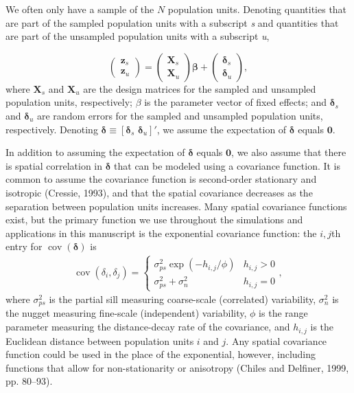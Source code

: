 \documentclass[]{elsarticle} %
\begin{document}
We often only have a sample of the \(N\) population units. Denoting
quantities that are part of the sampled population units with a
subscript \emph{s} and quantities that are part of the unsampled
population units with a subscript \emph{u},

\begin{equation}
\begin{pmatrix} \label{equation:Zmarginal}
    \mathbf{z}_s      \\
    \mathbf{z}_u
\end{pmatrix}
=
\begin{pmatrix}
  \mathbf{X}_s    \\
  \mathbf{X}_u
\end{pmatrix}
\bm{\beta} +
\begin{pmatrix}
\bm{\delta}_s    \\
\bm{\delta}_u
\end{pmatrix},
\end{equation} where \(\mathbf{X}_s\) and \(\mathbf{X}_u\) are the
design matrices for the sampled and unsampled population units,
respectively; \(\beta\) is the parameter vector of fixed effects; and
\(\bm{\delta}_s\) and \(\bm{\delta}_u\) are random errors for the
sampled and unsampled population units, respectively. Denoting
\(\bm{\delta} \equiv [\bm{\delta}_s \,\, \bm{\delta}_u]'\), we assume
the expectation of \(\bm{\delta}\) equals \(\mathbf{0}\).

In addition to assuming the expectation of \(\bm{\delta}\) equals
\(\mathbf{0}\), we also assume that there is spatial correlation in
\(\bm{\delta}\) that can be modeled using a covariance function. It is
common to assume the covariance function is second-order stationary and
isotropic (Cressie, 1993), and that the spatial covariance decreases as
the separation between population units increases. Many spatial
covariance functions exist, but the primary function we use throughout
the simulations and applications in this manuscript is the exponential
covariance function: the \(i,j\)th entry for
\(\mathop{\mathrm{{cov}}}(\bm{\delta})\) is \mbox{}
\begin{align}\label{equation:expcov}
\mathop{\mathrm{{cov}}}(\delta_i, \delta_j) = 
\begin{cases} 
\sigma^2_{ps}\exp(-h_{i,j}/\phi) & h_{i,j} > 0 \\
\sigma^2_{ps} + \sigma^2_n & h_{i,j} = 0
\end{cases}
,
\end{align} where \(\sigma^2_{ps}\) is the partial sill measuring
coarse-scale (correlated) variability, \(\sigma^2_{n}\) is the nugget
measuring fine-scale (independent) variability, \(\phi\) is the range
parameter measuring the distance-decay rate of the covariance, and
\(h_{i,j}\) is the Euclidean distance between population units \(i\) and
\(j\). Any spatial covariance function could be used in the place of the
exponential, however, including functions that allow for
non-stationarity or anisotropy (Chiles and Delfiner, 1999, pp. 80--93).
\end{document}
